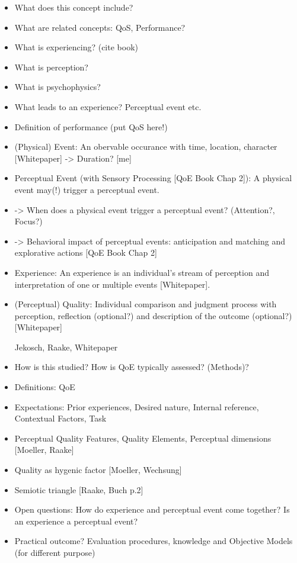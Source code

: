 \begin{itemize}
\item What does this concept include?
\item What are related concepts: QoS, Performance?
\item What is experiencing? (cite book)
\item What is perception?
\item What is psychophysics?
\item What leads to an experience? Perceptual event etc.
\item Definition of performance (put QoS here!)

\item (Physical) Event: An obervable occurance with time, location, character [Whitepaper] -> Duration? [me]
    
\item Perceptual Event (with Sensory Processing [QoE Book Chap 2]): A physical event may(!) trigger a perceptual event.
\item -> When does a physical event trigger a perceptual event? (Attention?, Focus?)
\item -> Behavioral impact of perceptual events: anticipation and matching and explorative actions [QoE Book Chap 2]
    
\item Experience: An experience is an individual's stream of perception and interpretation of one or multiple events [Whitepaper].
\item (Perceptual) Quality: Individual comparison and judgment process with perception, reflection (optional?) and description of the outcome (optional?) [Whitepaper]
\item [Jekosch, Raake, Whitepaper]

\item How is this studied? How is QoE typically assessed? (Methods)?
\item Definitions: QoE
    
\item Expectations: Prior experiences, Desired nature, Internal reference, Contextual Factors, Task

\item Perceptual Quality Features, Quality Elements, Perceptual dimensions [Moeller, Raake]
\item Quality as hygenic factor [Moeller, Wechsung]

\item Semiotic triangle [Raake, Buch p.2]

\item Open questions: How do experience and perceptual event come together? Is an experience a perceptual event?

\item Practical outcome? Evaluation procedures, knowledge and Objective Models (for different purpose)
\end{itemize}

